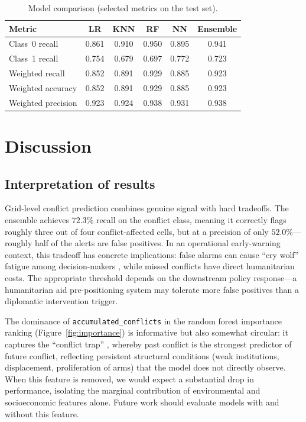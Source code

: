 \documentclass[11pt,a4paper]{article}
\begin{document}
\begin{table}[H]
  \centering
  \small
  \caption{Model comparison (selected metrics on the test set).}
  \label{tab:comparison}
  \begin{tabular}{lccccc}
    \toprule
    Metric & LR & KNN & RF & NN & Ensemble \\
    \midrule
    Class~0 recall & 0.861 & 0.910 & 0.950 & 0.895 & 0.941 \\
    Class~1 recall & 0.754 & 0.679 & 0.697 & 0.772 & 0.723 \\
    Weighted recall & 0.852 & 0.891 & 0.929 & 0.885 & 0.923 \\
    Weighted accuracy & 0.852 & 0.891 & 0.929 & 0.885 & 0.923 \\
    Weighted precision & 0.923 & 0.924 & 0.938 & 0.931 & 0.938 \\
    \bottomrule
  \end{tabular}
\end{table}

\section{Discussion}

\subsection{Interpretation of results}

Grid-level conflict prediction combines genuine signal with hard tradeoffs. The ensemble achieves $72.3\%$ recall on the conflict class, meaning it correctly flags roughly three out of four conflict-affected cells, but at a precision of only $52.0\%$---roughly half of the alerts are false positives. In an operational early-warning context, this tradeoff has concrete implications: false alarms can cause ``cry wolf'' fatigue among decision-makers \parencite{mueller2022hard}, while missed conflicts have direct humanitarian costs. The appropriate threshold depends on the downstream policy response---a humanitarian aid pre-positioning system may tolerate more false positives than a diplomatic intervention trigger.

The dominance of \texttt{accumulated\_conflicts} in the random forest importance ranking (Figure~\ref{fig:importance}) is informative but also somewhat circular: it captures the ``conflict trap'' \parencite{cederman2017predicting}, whereby past conflict is the strongest predictor of future conflict, reflecting persistent structural conditions (weak institutions, displacement, proliferation of arms) that the model does not directly observe. When this feature is removed, we would expect a substantial drop in performance, isolating the marginal contribution of environmental and socioeconomic features alone. Future work should evaluate models with and without this feature.
\end{document}
